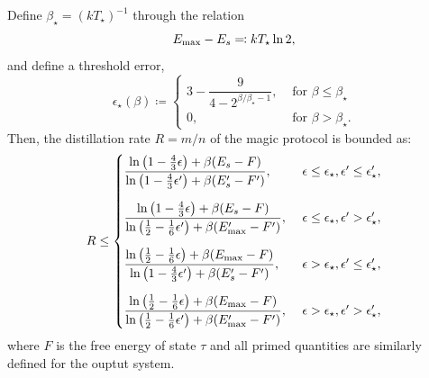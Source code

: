 \documentclass[pra,
aps,
twocolumn,
superscriptaddress,
groupedaddress,
nofootinbib,
reprint
]{revtex4-1}
\begin{document}
\begin{theorem}
Define $\beta_\star = (k T_\star)^{-1}$ through the relation
\begin{equation}
	E_{\rm max} - E_s \eqqcolon kT_\star \ln 2,
\end{equation}
and define a threshold error,
\begin{equation}\label{eq:threshold}
	\epsilon_{\star}(\beta) \coloneqq 
	\begin{cases}
		3 - \dfrac{9}{4-2^{\beta/\beta_\star - 1}}, &\text{ for } \beta \leq \beta_\star \\
		0, &\text{ for } \beta > \beta_\star.
	\end{cases}
\end{equation}
Then, the distillation rate $R = m/n$ of the magic protocol is bounded as:
\begin{equation}
	R \leq
	\begin{cases}
		\dfrac{\ln \big( 1-\frac{4}{3}\epsilon \big) + \beta (E_s - F)}{\ln \big( 1-\frac{4}{3}\epsilon' \big) + \beta (E'_s - F')},\ &\epsilon \leq \epsilon_\star, \epsilon' \leq \epsilon'_\star, \vspace{10pt}\\
		\dfrac{\ln \big( 1-\frac{4}{3}\epsilon \big) + \beta (E_s - F)}{\ln \big( \frac{1}{2}-\frac{1}{6}\epsilon' \big) + \beta (E'_{\rm{max}} - F')},\ &\epsilon \leq \epsilon_\star, \epsilon' > \epsilon'_\star, \vspace{10pt}\\
		\dfrac{\ln \big( \frac{1}{2}-\frac{1}{6}\epsilon \big) + \beta (E_{\rm{max}} - F)}{\ln \big( 1-\frac{4}{3}\epsilon' \big) + \beta (E'_s - F')},\ &\epsilon > \epsilon_\star, \epsilon' \leq \epsilon'_\star, \vspace{10pt}\\
		\dfrac{\ln\big( \frac{1}{2}-\frac{1}{6}\epsilon \big) + \beta (E_{\rm{max}} - F)}{\ln \big( \frac{1}{2}-\frac{1}{6}\epsilon' \big) + \beta (E'_{\rm{max}} - F')},\ &\epsilon > \epsilon_\star, \epsilon' > \epsilon'_\star,
	\end{cases}
\end{equation}
where $F$ is the free energy of state $\tau$ and all primed quantities are similarly defined for the ouptut system.
\end{theorem}
\end{document}

